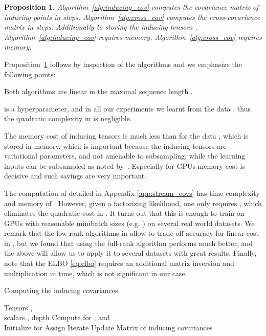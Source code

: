 \documentclass{article}
\newtheorem{proposition}{Proposition}
\begin{document}
  \begin{proposition}\label{eq:complexity}
	Algorithm~\ref{alg:inducing_cov} computes the covariance matrix  of  inducing points in  steps.
	Algorithm~\ref{alg:cross_cov} computes the cross-covariance matrix  in  steps.
  Additionally to storing the inducing tensors , Algorithm~\ref{alg:inducing_cov} requires  memory, Algorithm~\ref{alg:cross_cov} requires  memory.
  \end{proposition}
  Proposition~\ref{eq:complexity} follows by inspection of the algorithms and we emphasize the following points:
  \begin{enumerate*}[label=(\roman*)]
  \item Both algorithms are linear in the maximal sequence length .
  \item  is a hyperparameter, and in all our experiments we learnt from the data , thus the quadratic complexity in  is negligible.
  \item The memory cost of inducing tensors  is much less than for the data , which is stored in  memory, which is important because the inducing tensors are variational parameters, and not amenable to subsampling, while the learning inputs can be subsampled as noted by~\cite{Hensman2013GaussianPF}.
  Especially for GPUs memory cost is decisive and such savings are very important.
  \end{enumerate*}
  
  The computation of  detailed in Appendix \ref{app:stream_covs} has time complexity  and memory of . However, given a factorizing likelihood, one only requires , which eliminates the quadratic cost in .
  It turns out that this is enough to train on GPUs with reasonable minibatch sizes (e.g. ) on several real world datasets. We remark that the low-rank algorithms in \cite{KiralyOberhauser2019KSig} allow to trade off accuracy for linear cost in , but we found that using the full-rank algorithm performs much better, and the above will allow us to apply it to several datasets with great results. Finally, note that the ELBO \eqref{eq:elbo} requires an additional matrix inversion and multiplication in  time, which is not significant in our case.
	
\begin{algorithm}[tb]
		\caption{Computing the inducing covariances }
		\label{alg:inducing_cov}
		\begin{algorithmic}[1]
			 Tensors , \\ scalars , depth  
			\STATE Compute  for ,  and  \\
			\STATE Initialize  for 
			\STATE Assign 
			\STATE Iterate 
			\ENDFOR
			\STATE Update 
			\ENDFOR
			 Matrix of inducing covariances 
		\end{algorithmic}
	\end{algorithm}
	
\end{document}
